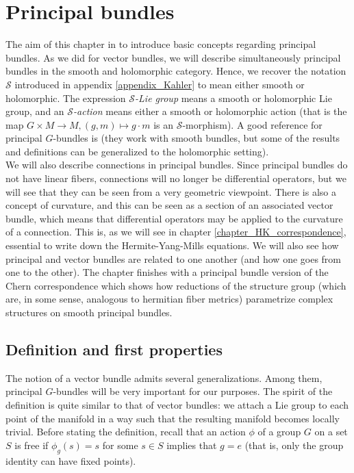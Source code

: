 \chapter{Principal bundles} \label{chapter_principal_bundles}
The aim of this chapter in to introduce basic concepts regarding principal bundles. As we did for vector bundles, we will describe simultaneously principal bundles in the smooth and holomorphic category. Hence, we recover the notation \(\mathcal{S}\) introduced in appendix \ref{appendix_Kahler} to mean either smooth or holomorphic. The expression \(\mathcal{S}\)\textit{-Lie group} means a smooth or holomorphic Lie group, and an \(\mathcal{S}\)\textit{-action} means either a smooth or holomorphic action (that is the map \(G \times M \to M, (g,m)\mapsto g \cdot m\) is an \(\mathcal{S}\)-morphism). A good reference for principal \(G\)-bundles is \parencite[Ch. 1]{Rudolph_2017pug} (they work with smooth bundles, but some of the results and definitions can be generalized to the holomorphic setting). \\

We will also describe connections in principal bundles. Since principal bundles do not have linear fibers, connections will no longer be differential operators, but we will see that they can be seen from a very geometric viewpoint. There is also a concept of curvature, and this can be seen as a section of an associated vector bundle, which means that differential operators may be applied to the curvature of a connection. This is, as we will see in chapter \ref{chapter_HK_correspondence}, essential to write down the Hermite-Yang-Mills equations. We will also see how principal and vector bundles are related to one another (and how one goes from one to the other). The chapter finishes with a principal bundle version of the Chern correspondence which shows how reductions of the structure group (which are, in some sense, analogous to hermitian fiber metrics) parametrize complex structures on smooth principal bundles.

\section{Definition and first properties}
The notion of a vector bundle admits several generalizations. Among them, principal \(G\)-bundles will be very important for our purposes. The spirit of the definition is quite similar to that of vector bundles: we attach a Lie group to each point of the manifold in a way such that the resulting manifold becomes locally trivial. Before stating the definition, recall that an action \(\phi\) of a group \(G\) on a set \(S\) is free if \(\phi_g(s)=s\) for some \(s \in S\) implies that \(g=e\) (that is, only the group identity can have fixed points).

